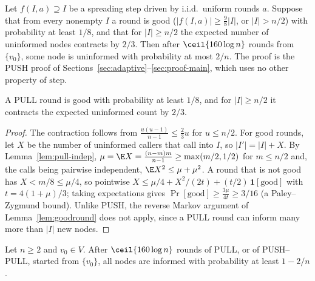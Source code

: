 \begin{lemma}
  \label{lem:pull-phases}
  \leanok
  Let $f(I,a) \supseteq I$ be a spreading step driven by i.i.d.\ uniform
  rounds $a$. Suppose that from every nonempty $I$ a round is good
  ($|f(I,a)| \ge \frac98 |I|$, or $|I| > n/2$) with probability at least
  $1/8$, and that for $|I| \ge n/2$ the expected number of uninformed nodes
  contracts by $2/3$. Then after $\ceil{160 \log n}$ rounds from $\{v_0\}$,
  some node is uninformed with probability at most $2/n$. The proof is the
  PUSH proof of Sections~\ref{sec:adaptive}--\ref{sec:proof-main}, which uses
  no other property of $\mathrm{step}$.
\end{lemma}

\begin{lemma}\label{lem:pull-good}
  \leanok
  A PULL round is good with probability at least $1/8$, and for
  $|I| \ge n/2$ it contracts the expected uninformed count by $2/3$.
\end{lemma}

\begin{proof}
  The contraction follows from $\frac{u(u-1)}{n-1} \le \frac23 u$ for
  $u \le n/2$. For good rounds, let $X$ be the number of uninformed callers
  that call into $I$, so $|I'| = |I| + X$. By Lemma~\ref{lem:pull-indep},
  $\mu = \E X = \frac{(n-m)m}{n-1} \ge \max(m/2, 1/2)$ for $m \le n/2$ and,
  the calls being pairwise independent, $\E X^2 \le \mu + \mu^2$. A round
  that is not good has $X < m/8 \le \mu/4$, so pointwise
  $X \le \mu/4 + X^2/(2t) + (t/2)\,\mathbf 1[\text{good}]$ with
  $t = 4(1+\mu)/3$; taking expectations gives
  $\Pr[\text{good}] \ge \frac{3\mu}{4t} \ge 3/16$ (a Paley--Zygmund bound).
  Unlike PUSH, the reverse Markov argument of Lemma~\ref{lem:goodround} does
  not apply, since a PULL round can inform many more than $|I|$ new nodes.
\end{proof}

\begin{theorem}
  \label{thm:pull}
  \leanok
  Let $n \ge 2$ and $v_0 \in V$. After $\ceil{160 \log n}$ rounds of PULL,
  or of PUSH--PULL, started from $\{v_0\}$, all nodes are informed with
  probability at least $1 - 2/n$.
\end{theorem}

